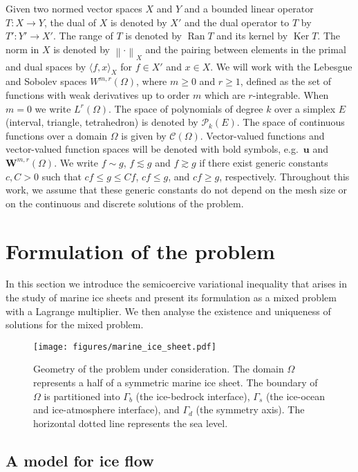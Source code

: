 \documentclass[onefignum,onetabnum]{siamart190516}
\newcommand{\bu}{\boldsymbol{u}}
\newcommand{\nrm}[1]{\left\lVert#1\right\rVert}
\newcommand{\Cc}{\mathcal{C}}
\newcommand{\Pc}{\mathcal{P}}
\DeclareMathOperator*{\Ran}{Ran}
\DeclareMathOperator*{\Ker}{Ker}
\begin{document}
Given two normed vector spaces $X$ and $Y$ and a bounded linear operator $T:X\to Y$, the dual of $X$ is denoted by $X'$ and the dual operator to $T$ by $T':Y'\to X'$. The range of $T$ is denoted by $\Ran{T}$ and its kernel by $\Ker{T}$. The norm in $X$ is denoted by $\nrm{\cdot}_X$ and the pairing between elements in the primal and dual spaces by $\langle f, x \rangle_X$ for $f\in X'$ and $x\in X$. We will work with the Lebesgue and Sobolev spaces $W^{m,r}(\Omega)$, where $m \geq 0$ and $r \geq 1$, defined as the set of functions with weak derivatives up to order $m$ which are $r$-integrable. When $m = 0$ we write $L^r(\Omega)$. The space of polynomials of degree $k$ over a simplex $E$ (interval, triangle, tetrahedron) is denoted by $\Pc_k(E)$. The space of continuous functions over a domain $\Omega$ is given by $\Cc(\Omega)$. Vector-valued functions and vector-valued function spaces will be denoted with bold symbols, e.g.~$\bu$ and $\boldsymbol{W}^{m,r}(\Omega)$. We write $f\sim g$, $f \lesssim g$ and $f \gtrsim g$ if there exist generic constants $c,C > 0$ such that $cf \leq g \leq Cf$, $c f \leq g$, and $cf \geq g$, respectively. Throughout this work, we assume that these generic constants do not depend on the mesh size or on the continuous and discrete solutions of the problem.

\section{Formulation of the problem}\label{sec:formulation}

In this section we introduce the semicoercive variational inequality that arises in the study of marine ice sheets and present its formulation as a mixed problem with a Lagrange multiplier. We then analyse the existence and uniqueness of solutions for the mixed problem.

\begin{figure}
	\centering
	\texttt{[image: figures/marine\_ice\_sheet.pdf]}
	\caption{Geometry of the problem under consideration. The domain $\Omega$ represents a half of a symmetric marine ice sheet. The boundary of $\Omega$ is partitioned into $\Gamma_b$ (the ice-bedrock interface), $\Gamma_s$ (the ice-ocean and ice-atmosphere interface), and $\Gamma_d$ (the symmetry axis). The horizontal dotted line represents the sea level.}
	\label{fig:domain}
\end{figure}

\subsection{A model for ice flow}
\end{document}
